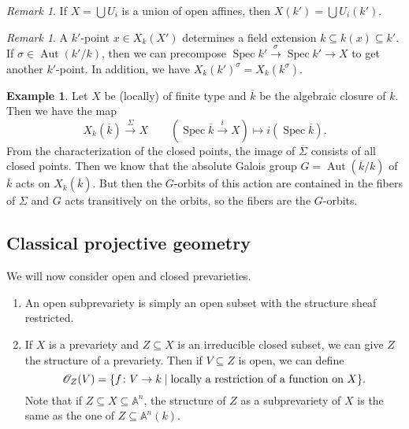 \documentclass[leqno, openany]{memoir}
\theoremstyle{definition}
\newtheorem{exm}[thm]{Example}
\theoremstyle{remark}
\newtheorem{rmk}[thm]{Remark}
\theoremstyle{plain}
\theoremstyle{definition}
\theoremstyle{remark}
\newcommand{\A}{\mathbb{A}}
\newcommand{\msc}[1]{\mathscr{#1}}
\newcommand{\ol}[1]{\overline{#1}}
\DeclareMathOperator{\Aut}{Aut}
\DeclareMathOperator{\Spec}{Spec}
\begin{document}
\begin{rmk}
    If $X = \bigcup U_i$ is a union of open affines, then $X(k') = \bigcup U_i(k')$. 
\end{rmk}

\begin{rmk}
    A $k'$-point $x \in X_k(X')$ determines a field extension $k \subseteq k(x) \subseteq k'$. If $\sigma \in \Aut(k'/k)$, then we can precompose $\Spec k' \xrightarrow{\sigma} \Spec k' \to X$ to get another $k'$-point. In addition, we have ${X_k(k')^{\sigma} = X_k(k^{\sigma})}$.
\end{rmk}

\begin{exm}
    Let $X$ be (locally) of finite type and $\ol{k}$ be the algebraic closure of $k$. Then we have the map
    \[ X_k(\ol{k}) \xrightarrow{\Sigma} X \qquad (\Spec \ol{k} \xrightarrow{i} X) \mapsto i(\Spec \ol{k}). \]
    From the characterization of the closed points, the image of $\ol{\Sigma}$ consists of all closed points. Then we know that the absolute Galois group $G = \Aut(\ol{k} / k)$ of $\ol{k}$ acts on $X_k(\ol{k})$. But then the $G$-orbits of this action are contained in the fibers of $\Sigma$ and $G$ acts transitively on the orbits, so the fibers are the $G$-orbits. 
\end{exm}

\subsection{Classical projective geometry}%
\label{sub:classical_projective_geometry}

We will now consider open and closed prevarieties.
\begin{enumerate}
    \item An open subprevariety is simply an open subset with the structure sheaf restricted.
    \item If $X$ is a prevariety and $Z \subseteq X$ is an irreducible closed subset, we can give $Z$ the structure of a prevariety. Then if $V \subseteq Z$ is open, we can define
        \[ \msc{O}_Z(V) = \qty{f \colon V \to k \mid \text{locally a restriction of a function on $X$}}. \]
        Note that if $Z \subseteq X \subseteq \A^n$, the structure of $Z$ as a subprevariety of $X$ is the same as the one of $Z \subseteq \A^n(k)$.
\end{enumerate}
\end{document}

